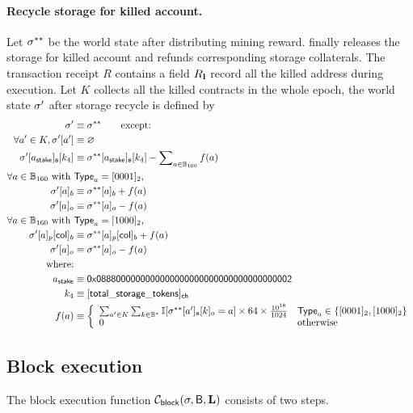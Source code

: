 \paragraph{Recycle storage for killed account. }

Let $\mathbf{\sigma}^{**}$ be the world state after distributing mining reward. \name finally releases the storage for killed account and refunds corresponding storage collaterals. The transaction receipt $R$ contains a field $R_{\bf l}$ record all the killed address during execution. Let $K$ collects all the killed contracts in the whole epoch, the world state $\mathbf{\sigma}'$ after storage recycle is defined by 
%
\begin{align}
	\st'&\eqdef \st^{**} \qquad \mbox{except:}\\
	\forall a'\in K, \st'[a']&\eqdef\varnothing \\
	\st'[a_{\sf stake}]_{\bf s}[k_4] & \eqdef \st^{**}[a_{\sf stake}]_{\bf s}[k_4] - \sum\nolimits_{a\in \B_{160}}f(a) \\
	\forall a \in \B_{160}
	 \mbox{ with }& {\sf Type}_a = [0001]_2, \\
	 \st'[a]_b& \eqdef\st^{**}[a]_b + f(a) \\ 
	 \st'[a]_o& \eqdef \st^{**}[a]_o - f(a)\\ 
	\forall a \in \B_{160}
	 \mbox{ with }&{\sf Type}_a = [1000]_2, \\ 
	 \st'[a]_p[{\sf col}]_b& \eqdef\st^{**}[a]_p[{\sf col}]_b + f(a) \\
	 \st'[a]_o& \eqdef \st^{**}[a]_o - f(a)\\
	\mbox{where:}  \\
	a_{\sf stake} & \eqdef \stakingcontract \\ 
	k_4 & \eqdef {\sf [total\char`_storage\char`_tokens]_{\sf ch}} \\ 
	f(a) &\eqdef \left\{\begin{array}{ll}
		\sum_{a'\in K}\sum_{k\in \B^*} \mathbb{I}[\st^{**}[a']_{\bf s}[k]_o=a]\times 64 \times \collateralperbyte & {\sf Type}_a \in \{[0001]_2, [1000]_2\} \\ 
		0 & \mbox{otherwise}
	\end{array}\right.
\end{align}

\subsection{Block execution}\label{sec:block_exec}
The block execution function $\mathcal{C}_{\sf block}(\mathbf{\sigma},\textsf{B},\mathbf{L})$ consists of two steps. 

